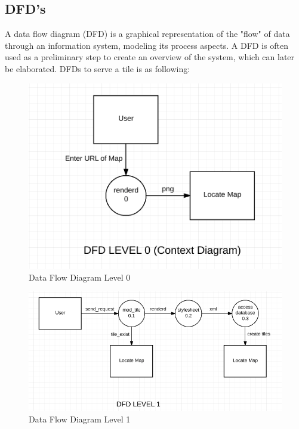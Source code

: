 \subsection{DFD's}
A data flow diagram (DFD) is a graphical representation of the "flow" of data through an information system, modeling its process aspects. A DFD is often used as a preliminary step to create an overview of the system, which can later be elaborated. DFDs to serve a tile is as following:
\begin{figure}[h!]
	\centering
	\includegraphics[scale=0.6]{input/images/DFD_0.png}
	\caption{Data Flow Diagram Level 0}
\end{figure}
\begin{figure}[h!]
	        \centering
		        \includegraphics[scale=0.6]{input/images/DFD_1.png}
			        \caption{Data Flow Diagram Level 1}
\end{figure}

